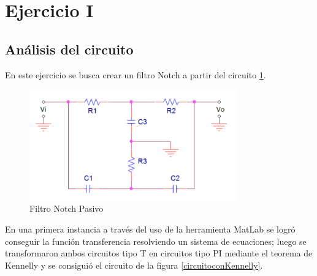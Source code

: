 



%
\section{Ejercicio I}
\subsection{Análisis del circuito}
En este ejercicio se busca crear un filtro Notch a partir del circuito \ref{fig:circuito_1}. 

\begin{figure}[H]                                                       
    \centering
    	\includegraphics[width=0.8\textwidth]{resources/circuito_1.png}
    	\caption{Filtro Notch Pasivo}
    	\label{fig:circuito_1}
\end{figure}

En una primera instancia a través del uso de la herramienta MatLab se logró conseguir la función transferencia resolviendo un sistema de ecuaciones; luego se transformaron ambos circuitos tipo T en circuitos tipo PI mediante el teorema de Kennelly y se consiguió el circuito de la figura \ref{circuitoconKennelly}.


